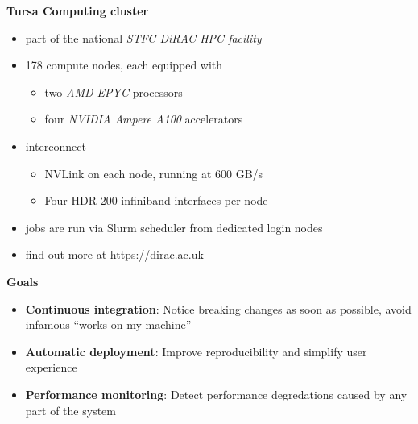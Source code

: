 \documentclass[english,xcolor=pst,11pt]{beamer}
\begin{document}
\begin{frame}
 \textbf{Tursa Computing cluster}
 \begin{itemize}
  \item part of the national \emph{STFC DiRAC HPC facility}
  \item 178 compute nodes, each equipped with
  \begin{itemize}
    \item two \emph{AMD EPYC} processors
    \item four \emph{NVIDIA Ampere A100} accelerators
  \end{itemize}
  \item interconnect
  \begin{itemize}
   \item NVLink on each node, running at 600 GB/s
   \item Four HDR-200 infiniband interfaces per node
  \end{itemize}

  \item jobs are run via Slurm scheduler from dedicated login nodes
  \item find out more at \url{https://dirac.ac.uk}

 \end{itemize}

\end{frame}

\begin{frame}

\textbf{Goals}
\begin{itemize}
 \item \textbf{Continuous integration}: Notice breaking changes as soon as possible, avoid infamous ``works on my machine''
 \item \textbf{Automatic deployment}: Improve reproducibility and simplify user experience
 \item \textbf{Performance monitoring}: Detect performance degredations caused by any part of the system
\end{itemize}

\end{frame}
\end{document}
